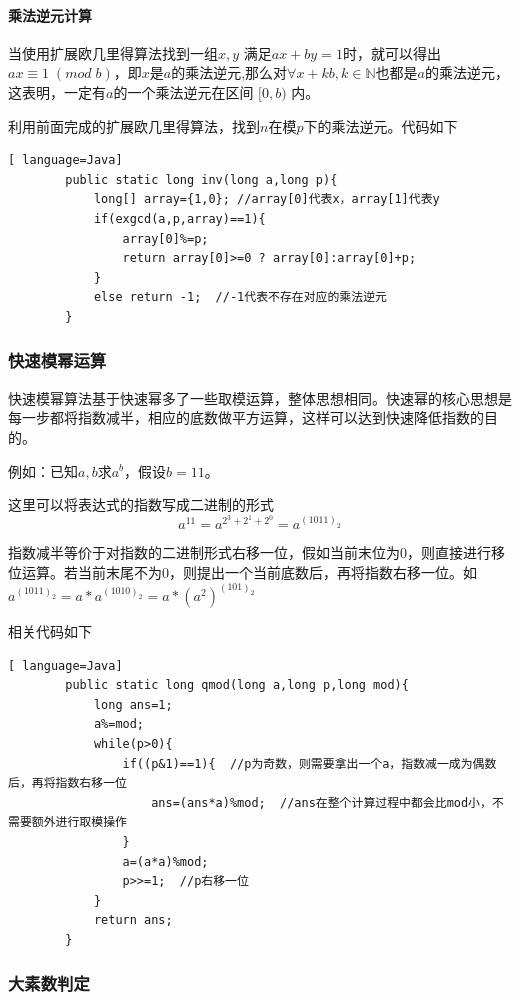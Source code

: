 \documentclass[UTF8,a4paper,11pt]{ctexart}
\begin{document}
\paragraph{乘法逆元计算}
	\indent \;
	\par 当使用扩展欧几里得算法找到一组$x,y$ 满足$ax+by=1$时，就可以得出$ax\equiv 1\; (mod\; b)$，即$x$是$a$的乘法逆元,那么对$\forall x+kb,k\in \mathbb{N}$也都是$a$的乘法逆元，这表明，一定有$a$的一个乘法逆元在区间 $[0,b)$ 内。
	\par 利用前面完成的扩展欧几里得算法，找到$n$在模$p$下的乘法逆元。代码如下
	\begin{lstlisting}[ language=Java]
		public static long inv(long a,long p){
	    	long[] array={1,0}; //array[0]代表x，array[1]代表y
	    	if(exgcd(a,p,array)==1){
	        	array[0]%=p;
	        	return array[0]>=0 ? array[0]:array[0]+p;
	    	}
	   		else return -1;  //-1代表不存在对应的乘法逆元
		}
	\end{lstlisting}

\subsubsection{快速模幂运算}
	\par 快速模幂算法基于快速幂多了一些取模运算，整体思想相同。快速幂的核心思想是每一步都将指数减半，相应的底数做平方运算，这样可以达到快速降低指数的目的。
	\par 例如：已知$a,b$求$a^{b}$，假设$b=11$。
	\par 这里可以将表达式的指数写成二进制的形式
	$$
		a^{11}=a^{2^{3}+2^{1}+2^{0}}=a^{(1011)_{2}}
	$$

	\par 指数减半等价于对指数的二进制形式右移一位，假如当前末位为0，则直接进行移位运算。若当前末尾不为0，则提出一个当前底数后，再将指数右移一位。如$a^{(1011)_{2}}=a*a^{(1010)_{2}}=a*(a^{2})^{(101)_{2}}$

	\par 相关代码如下
	\begin{lstlisting}[ language=Java]
		public static long qmod(long a,long p,long mod){
		    long ans=1;
		    a%=mod;
		    while(p>0){
		        if((p&1)==1){  //p为奇数，则需要拿出一个a，指数减一成为偶数后，再将指数右移一位
		            ans=(ans*a)%mod;  //ans在整个计算过程中都会比mod小，不需要额外进行取模操作
		        }
		        a=(a*a)%mod;
		        p>>=1;  //p右移一位
		    }
		    return ans;
		}
	\end{lstlisting}
	
\subsubsection{大素数判定}
\end{document}
